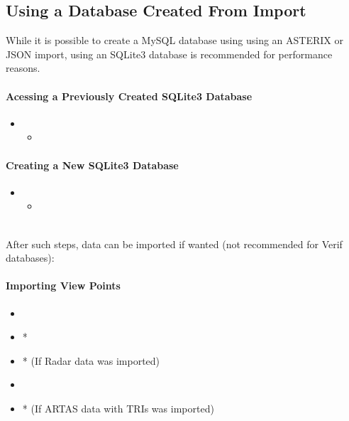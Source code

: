 \subsection{Using a Database Created From Import}

While it is possible to create a MySQL database using using an ASTERIX or JSON import, using an SQLite3 database is recommended for performance reasons.

\paragraph{Acessing a Previously Created SQLite3 Database} 

\begin{itemize}
\item {}
\begin{itemize}
 \item {}
 \end{itemize}
 \end{itemize}

\paragraph{Creating a New SQLite3 Database}

\begin{itemize}
\item {}
\begin{itemize}
 \item {}
\end{itemize}
\end{itemize}
\ \\

After such steps, data can be imported if wanted (not recommended for Verif databases):

\paragraph{Importing View Points} 

\begin{itemize}
 \item {}
 \item {}*
 \item {}* (If Radar data was imported)
 \item {}
 \item {}* (If ARTAS data with TRIs was imported)
\end{itemize}

